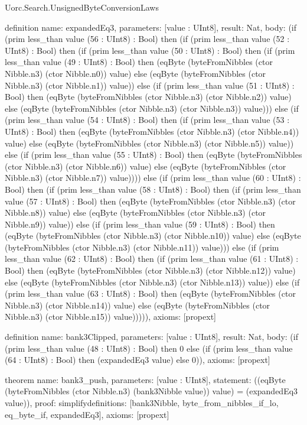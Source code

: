 \begin{lexlean}{Uorc.Search.UnsignedByteConversionLaws}
\begin{semanticmodule}
definition{
  name: expandedEq3,
  parameters: [value : UInt8],
  result: Nat,
  body: (if (prim less_than value (56 : UInt8) : Bool) then (if (prim less_than value (52 : UInt8) : Bool) then (if (prim less_than value (50 : UInt8) : Bool) then (if (prim less_than value (49 : UInt8) : Bool) then (eqByte (byteFromNibbles (ctor Nibble.n3) (ctor Nibble.n0)) value) else (eqByte (byteFromNibbles (ctor Nibble.n3) (ctor Nibble.n1)) value)) else (if (prim less_than value (51 : UInt8) : Bool) then (eqByte (byteFromNibbles (ctor Nibble.n3) (ctor Nibble.n2)) value) else (eqByte (byteFromNibbles (ctor Nibble.n3) (ctor Nibble.n3)) value))) else (if (prim less_than value (54 : UInt8) : Bool) then (if (prim less_than value (53 : UInt8) : Bool) then (eqByte (byteFromNibbles (ctor Nibble.n3) (ctor Nibble.n4)) value) else (eqByte (byteFromNibbles (ctor Nibble.n3) (ctor Nibble.n5)) value)) else (if (prim less_than value (55 : UInt8) : Bool) then (eqByte (byteFromNibbles (ctor Nibble.n3) (ctor Nibble.n6)) value) else (eqByte (byteFromNibbles (ctor Nibble.n3) (ctor Nibble.n7)) value)))) else (if (prim less_than value (60 : UInt8) : Bool) then (if (prim less_than value (58 : UInt8) : Bool) then (if (prim less_than value (57 : UInt8) : Bool) then (eqByte (byteFromNibbles (ctor Nibble.n3) (ctor Nibble.n8)) value) else (eqByte (byteFromNibbles (ctor Nibble.n3) (ctor Nibble.n9)) value)) else (if (prim less_than value (59 : UInt8) : Bool) then (eqByte (byteFromNibbles (ctor Nibble.n3) (ctor Nibble.n10)) value) else (eqByte (byteFromNibbles (ctor Nibble.n3) (ctor Nibble.n11)) value))) else (if (prim less_than value (62 : UInt8) : Bool) then (if (prim less_than value (61 : UInt8) : Bool) then (eqByte (byteFromNibbles (ctor Nibble.n3) (ctor Nibble.n12)) value) else (eqByte (byteFromNibbles (ctor Nibble.n3) (ctor Nibble.n13)) value)) else (if (prim less_than value (63 : UInt8) : Bool) then (eqByte (byteFromNibbles (ctor Nibble.n3) (ctor Nibble.n14)) value) else (eqByte (byteFromNibbles (ctor Nibble.n3) (ctor Nibble.n15)) value))))),
  axioms: [propext]
}

definition{
  name: bank3Clipped,
  parameters: [value : UInt8],
  result: Nat,
  body: (if (prim less_than value (48 : UInt8) : Bool) then 0 else (if (prim less_than value (64 : UInt8) : Bool) then (expandedEq3 value) else 0)),
  axioms: [propext]
}

theorem{
  name: bank3_push,
  parameters: [value : UInt8],
  statement: ((eqByte (byteFromNibbles (ctor Nibble.n3) (bank3Nibble value)) value) = (expandedEq3 value)),
  proof: simplify{definitions: [bank3Nibble, byte_from_nibbles_if_lo, eq_byte_if, expandedEq3]},
  axioms: [propext]
}


\end{semanticmodule}
\end{lexlean}
